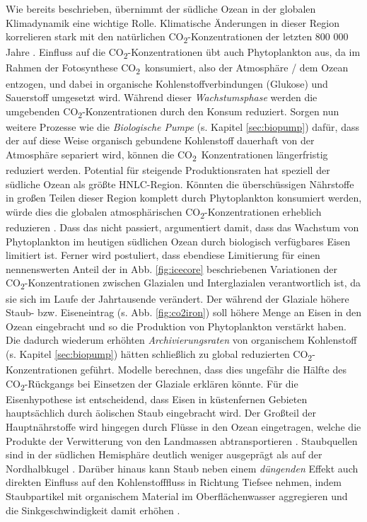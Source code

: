 \documentclass[12pt,a4paper,onecolumn]{scrartcl}
\newcommand{\cotwo}{CO\textsubscript{2}}
\begin{document}
Wie bereits beschrieben, übernimmt der südliche Ozean in der globalen Klimadynamik eine wichtige Rolle. Klimatische Änderungen in dieser Region korrelieren stark mit den natürlichen \cotwo -Konzentrationen der letzten 800 000 Jahre \citep{Fischer.2010}. Einfluss auf die \cotwo -Konzentrationen übt auch Phytoplankton aus, da im Rahmen der Fotosynthese \cotwo \ konsumiert, also der Atmosphäre / dem Ozean entzogen, und dabei in organische Kohlenstoffverbindungen (Glukose) und Sauerstoff umgesetzt wird. Während dieser \textit{Wachstumsphase} werden die umgebenden \cotwo -Konzentrationen durch den Konsum reduziert. Sorgen nun weitere Prozesse wie die \textit{Biologische Pumpe} (s. Kapitel \ref{sec:biopump}) dafür, dass der auf diese Weise organisch gebundene Kohlenstoff dauerhaft von der Atmosphäre separiert wird, können die \cotwo \ Konzentrationen längerfristig reduziert werden. Potential für steigende Produktionsraten hat speziell der südliche Ozean als größte HNLC-Region. Könnten die überschüssigen Nährstoffe in großen Teilen dieser Region komplett durch Phytoplankton konsumiert werden, würde dies die globalen atmosphärischen \cotwo -Konzentrationen erheblich reduzieren \citep{Martin.1990}. Dass das nicht passiert, argumentiert \citet{Martin.1990} damit, dass das Wachstum von Phytoplankton im heutigen südlichen Ozean durch biologisch verfügbares Eisen limitiert ist. Ferner wird postuliert, dass ebendiese Limitierung für einen nennenswerten Anteil der in Abb. \ref{fig:icecore} beschriebenen Variationen der \cotwo -Konzentrationen zwischen Glazialen und Interglazialen verantwortlich ist, da sie sich im Laufe der Jahrtausende verändert. Der während der Glaziale höhere Staub- bzw. Eiseneintrag (s. Abb. \ref{fig:co2iron}) soll höhere Menge an Eisen in den Ozean eingebracht und so die Produktion von Phytoplankton verstärkt haben. Die dadurch wiederum erhöhten \textit{Archivierungsraten} von organischem Kohlenstoff (s. Kapitel \ref{sec:biopump}) hätten schließlich zu global reduzierten \cotwo -Konzentrationen geführt. Modelle berechnen, dass dies ungefähr die Hälfte des \cotwo -Rückgangs bei Einsetzen der Glaziale erklären könnte. Für die Eisenhypothese ist entscheidend, dass Eisen in küstenfernen Gebieten hauptsächlich durch äolischen Staub eingebracht wird. Der Großteil der Hauptnährstoffe wird hingegen durch Flüsse in den Ozean eingetragen, welche die Produkte der Verwitterung von den Landmassen abtransportieren \citep{Emerson.2009}. Staubquellen sind in der südlichen Hemisphäre deutlich weniger ausgeprägt als auf der Nordhalbkugel \citep{Shao.2011}. Darüber hinaus kann Staub neben einem \textit{düngenden} Effekt auch direkten Einfluss auf den Kohlenstofffluss in Richtung Tiefsee nehmen, indem Staubpartikel mit organischem Material im Oberflächenwasser aggregieren und die Sinkgeschwindigkeit damit erhöhen \citep{vanderJagt.2018}.
\end{document}
